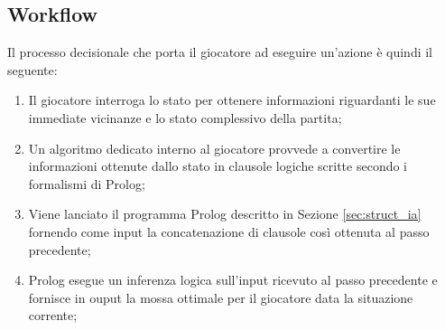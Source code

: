 \subsection{Workflow}
Il processo decisionale che porta il giocatore ad eseguire un'azione \`{e} quindi il seguente:
\begin{enumerate}
 \item Il giocatore interroga lo stato per ottenere informazioni riguardanti le sue immediate vicinanze e lo stato complessivo della partita;
 \item Un algoritmo dedicato interno al giocatore provvede a convertire le informazioni ottenute dallo stato in clausole logiche scritte secondo i formalismi di Prolog; 
 \item Viene lanciato il programma Prolog descritto in Sezione \ref{sec:struct_ia} fornendo come input la concatenazione di clausole cos\`{i} ottenuta al passo precedente;
 \item Prolog esegue un inferenza logica sull'input ricevuto al passo precedente e fornisce in ouput la mossa ottimale per il giocatore data la situazione corrente;
 \end{enumerate} 
